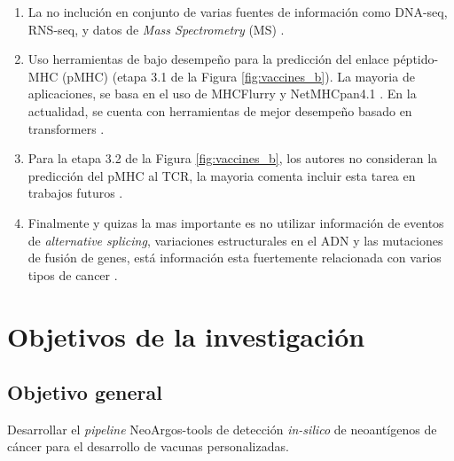 \documentclass[a4paper]{article}
\begin{document}
\begin{enumerate}
	\item La no inclución en conjunto de varias fuentes de información como DNA-seq, RNS-seq, y datos de \textit{Mass Spectrometry} (MS)  \citep{kim2018neopepsee}.
	\item  Uso herramientas de bajo desempeño para la predicción del enlace péptido-MHC (pMHC) (etapa 3.1  de la Figura \ref{fig:vaccines_b}). La mayoria de aplicaciones, se basa en el uso de MHCFlurry \citep{o2020mhcflurry} y NetMHCpan4.1 \citep{reynisson2020netmhcpan}. En la actualidad, se cuenta con herramientas de mejor desempeño basado en transformers \citep{arceda2023neoantigen}.
	\item Para la etapa 3.2 de la Figura \ref{fig:vaccines_b}, los autores no consideran  la predicción del pMHC al TCR, la mayoria comenta incluir esta tarea en trabajos futuros  \citep{rubinsteyn2018computational}.
	\item Finalmente y quizas la mas importante es no utilizar información de eventos de \textit{alternative splicing}, variaciones estructurales en el ADN y las mutaciones de fusión de genes, está información esta fuertemente relacionada con varios tipos de cancer \citep{wood2020neoepiscope}.
\end{enumerate}

	
\section{Objetivos de la investigación}
	
	\subsection{Objetivo general}
	
	Desarrollar el \textit{pipeline} NeoArgos-tools de detección \textit{in-silico} de neoantígenos de cáncer para el desarrollo de vacunas personalizadas.
	
\end{document}
